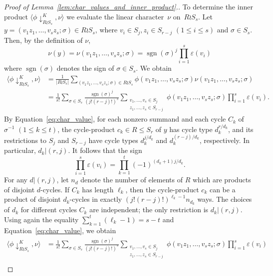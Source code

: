 \documentclass[ALCO,published]{cedram}
\DeclareMathOperator\sgn{sgn}
\begin{document}
\begin{proof}[Proof of  Lemma~\ref{lem:char_values_and_inner_product}.]
    To determine the inner product $\langle \phi\downarrow_{R\wr S_{s}}^K,\nu\rangle$ we evaluate the linear character~$\nu$ on~$R\wr S_{s}$.
    Let $y = (v_1z_1,\ldots, v_sz_s; \sigma)\in R\wr S_s$, 
    where $v_i\in S_j, z_i\in S_{r-j}$ $(1 \le i \le s)$ and $\sigma\in S_s$. Then, by the definition of $\nu$,
    \[
        \nu(y)
        = \nu(v_1z_1,\ldots, v_sz_s; \sigma)
        = \sgn(\sigma)^j 
        \prod_{i=1}^s \varepsilon(v_i)
    \]
    where $\sgn(\sigma)$ denotes the sign of $\sigma \in S_s$.
    We obtain
    \begin{align*}
        \langle \phi\downarrow_{R\wr S_{s}}^K,\nu\rangle
        &= \frac{1}{|R\wr S_{s}|}
        \sum_{(v_1 z_1,\ldots,v_s z_s;\sigma) \in R\wr S_{s}} 
        \phi(v_1 z_1,\ldots,v_s z_s;\sigma)
        \nu(v_1 z_1,\ldots,v_s z_s;\sigma) \\
        &= \frac{1}{s!} \sum_{\sigma\in S_s} 
        \frac{\sgn(\sigma)^j}{(j!(r-j)!)^s} 
        \sum_{\substack{v_1,\ldots ,v_s \in S_j \\ z_1,\ldots, z_s \in S_{r-j}}}
        \phi(v_1z_1,\ldots,v_sz_s;\sigma)
        \prod_{i=1}^s \varepsilon(v_i).
    \end{align*}
    By Equation~\eqref{eq:char_value},
    for each nonzero summand and each cycle $C_k$ of $\sigma^{-1}$ $(1 \le k \le t)$,
    the cycle-product $c_k \in R \le S_r$ of $y$ has cycle type $d_k^{r/d_k}$, and its restrictions to $S_j$ and $S_{r-j}$ have cycle types $d_k^{j/{d_k}}$ and $d_k^{(r-j)/{d_k}}$, respectively. 
    In particular, $d_k | (r,j)$.
    It follows that the sign
    \[
        \prod_{i=1}^s \varepsilon(v_i)
        = \prod_{k=1}^{t} (-1)^{(d_k+1)j/d_k}. 
    \]
    For any $d | (r,j)$, 
    let $n_d$ denote the number of elements of $R$ which are products of disjoint $d$-cycles. 
    If $C_k$ has length $\ell_k$, then 
    the cycle-product $c_k$ can be a product of disjoint $d_k$-cycles in exactly $(j!(r-j)!)^{\ell_k-1}n_{d_k}$ ways.
    The choices of $d_k$ for different cycles $C_k$  are independent; the only restriction is $d_k|(r,j)$. 
    Using again the equality $\sum_{k=1}^{t} (\ell_k - 1) = s-t$ and Equation~\eqref{eq:char_value}, 
    we obtain 
    \begin{align*}
        \langle \phi\downarrow_{R\wr S_{s}}^K,\nu \rangle
        &= \frac{1}{s!} \sum_{\sigma\in S_s} 
        \frac{\sgn(\sigma)^j}{(j!(r-j)!)^s} 
        \sum_{\substack{v_1,\ldots ,v_s \in S_j \\ z_1,\ldots, z_s \in S_{r-j}}} 
        \phi(v_1z_1,\ldots,v_sz_s;\sigma) 
        \prod_{i=1}^s \varepsilon(v_i) \\

\end{align*}
\end{proof}
\end{document}
